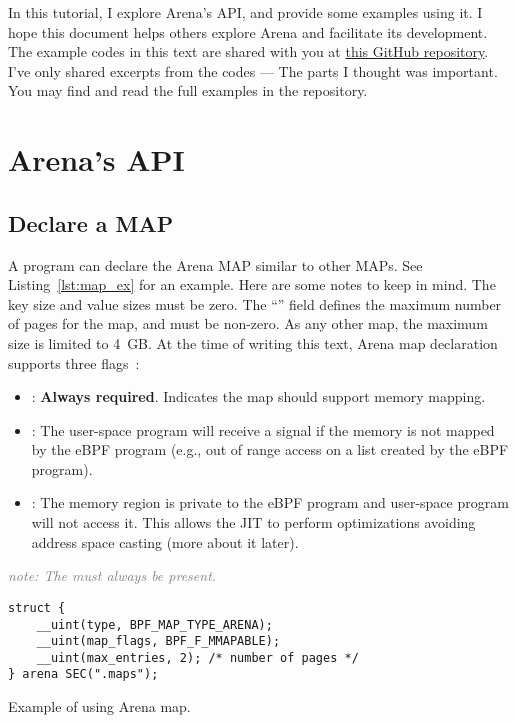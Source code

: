 \documentclass{article} \usepackage{graphicx}
\begin{document}
In this tutorial, I explore Arena's API, and provide some examples using it. I
hope this document helps others explore Arena and facilitate its development.
The example codes in this text are shared with you at
\href{https://github.com/bpf-endeavor/ebpf-arena-tutorial}{this GitHub  repository}.
I've only shared excerpts from the codes --- The parts I thought was important.
You may find and read the full examples in the repository.


\section{Arena's API}

\subsection{Declare a MAP}
A program can declare the Arena MAP similar to other MAPs. See Listing~\ref{lst:map_ex}
for an example. Here are some notes to keep in mind. The key size and value
sizes must be zero. The ``'' field defines the maximum number
of pages for the map, and must be non-zero. As any other map, the maximum size
is limited to 4~GB. At the time of writing this text, Arena map declaration
supports three flags~\cite{arena_source}:
\begin{itemize}
    \item {}: \textbf{Always required}. Indicates the map should
        support memory mapping.
    \item {}: The user-space program will receive a
         signal if the memory is not mapped by the eBPF program
        (e.g., out of range access on a list created by the eBPF program).
    \item {}: The memory region is private to the eBPF
        program and user-space program will not access it. This allows the JIT
        to perform optimizations avoiding address space casting (more about it
        later).
\end{itemize}
\textcolor{gray}{\textit{note: The  must always be present.}}

\centering
\begin{listing}
\begin{verbatim}
struct {
    __uint(type, BPF_MAP_TYPE_ARENA);
    __uint(map_flags, BPF_F_MMAPABLE);
    __uint(max_entries, 2); /* number of pages */
} arena SEC(".maps");
\end{verbatim}
    \caption{Example of using Arena map.}
    \label{lst:map_ex}
\end{listing}
\end{document}
